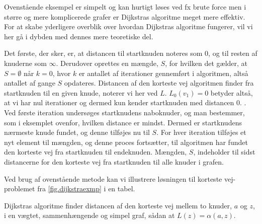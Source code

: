 Ovenstående eksempel er simpelt og kan hurtigt løses ved fx brute force men i større og mere komplicerede grafer er Dijkstras algoritme meget mere effektiv. For at skabe yderligere overblik over hvordan Dijkstras algoritme fungerer, vil vi her gå i dybden med dennes mere teoretiske del.

Det første, der sker, er, at distancen til startknuden noteres som $0$, og til resten af knuderne som $\infty$. Derudover oprettes en mængde, $S$, for hvilken det gælder, at $S = \emptyset$ når $k = 0$, hvor $k$ er antallet af iterationer gennemført i algoritmen, altså antallet af gange $S$ opdateres. Distancen af den korteste vej algoritmen finder fra startknuden til en given knude, noterer vi her ved $L$. $L_{0}(v_1)=0$ betyder altså, at vi har nul iterationer og dermed kun kender startknuden med distancen $0$. . Ved første iteration undersøges startknudens naboknuder, og man bestemmer, som i eksemplet ovenfor, hvilken distance er mindst. Dermed er startknudens nærmeste knude fundet, og denne tilføjes nu til $S$. For hver iteration tilføjes et nyt element til mængden, og denne proces fortsætter, til algoritmen har fundet den korteste vej fra startknuden til endeknuden. Mængden, $S$, indeholder til sidst distancerne for den korteste vej fra startknuden til alle knuder i grafen. 

Ved brug af ovenstående metode kan vi illustrere løsningen til korteste vej-problemet fra \autoref{fig.dijkstraexmp} i en tabel.



\begin{thm} \label{thm:dijkstra}
Dijkstras algoritme finder distancen af den korteste vej mellem to knuder, $a$ og $z$, i en vægtet, sammenhængende og simpel graf, sådan at $L(z)=\alpha(a,z)$. 
\end{thm}

